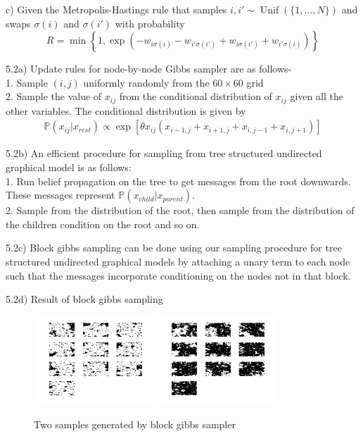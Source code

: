 \documentclass[10pt,onecolumn,letterpaper]{article}
\begin{document}
c) Given the Metropolis-Hastings rule that samples $i,i'\sim\operatorname{Unif}(\{1,\dotsc, N\})$ and swaps $\sigma(i)$ and $\sigma(i')$ with probability
\begin{equation*}
 R = \min\left\{1, \exp(-w_{i\sigma(i)}-w_{i'\sigma(i')}+w_{i\sigma(i')}+w_{i'\sigma(i)}) \right\}
\end{equation*}

\pagebreak
5.2a) Update rules for node-by-node Gibbs sampler are as follows- \\
1. Sample $(i,j)$ uniformly randomly from the $60\times 60$ grid \\
2. Sample the value of $x_{ij}$ from the conditional distribution of $x_{ij}$ given all the other variables. The conditional distribution is given by
\begin{align*}
\mathbb{P}(x_{ij}|x_{rest}) \propto \exp \left[ \theta x_{ij}\left(x_{i-1,j} + x_{i+1,j} + x_{i,j-1} + x_{i,j+1}\right) \right]
\end{align*}

5.2b) An efficient procedure for sampling from tree structured undirected graphical model is as follows: \\
1. Run belief propagation on the tree to get messages from the root downwards. These messages represent $\mathbb{P}(x_{child}|x_{parent})$. \\
2. Sample from the distribution of the root, then sample from the distribution of the children condition on the root and so on.

5.2c) Block gibbs sampling can be done using our sampling procedure for tree structured undirected graphical models by attaching a unary term to each node such that the messages incorporate conditioning on the nodes not in that block.

5.2d) Result of block gibbs sampling
\begin{figure}[htbp]
  \centering
    \includegraphics[width=0.4\textwidth]{Images/block_1.png}
    \hfill
	\includegraphics[width=0.4\textwidth]{Images/block_3.png}
    \caption{Two samples generated by block gibbs sampler} 
\end{figure}
\end{document}
